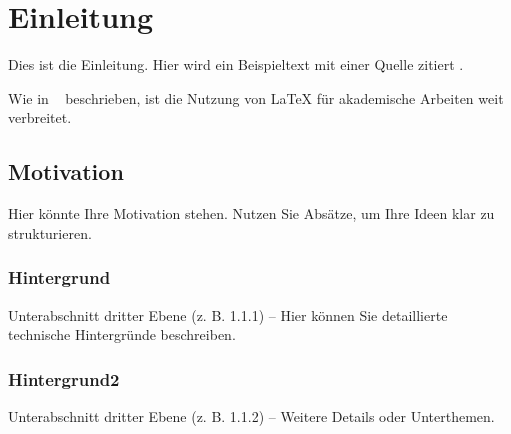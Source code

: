 \section{Einleitung}
Dies ist die Einleitung. Hier wird ein Beispieltext mit einer Quelle zitiert \cite{ieee_example}. 

Wie in ~\cite{ieee_example} beschrieben, 
ist die Nutzung von \LaTeX{} für akademische Arbeiten weit verbreitet.

\subsection{Motivation}
Hier könnte Ihre Motivation stehen. Nutzen Sie Absätze, um Ihre Ideen klar zu strukturieren.

\subsubsection{Hintergrund}
Unterabschnitt dritter Ebene (z. B. 1.1.1) – Hier können Sie detaillierte technische Hintergründe beschreiben.

\subsubsection{Hintergrund2}
Unterabschnitt dritter Ebene (z. B. 1.1.2) – Weitere Details oder Unterthemen.